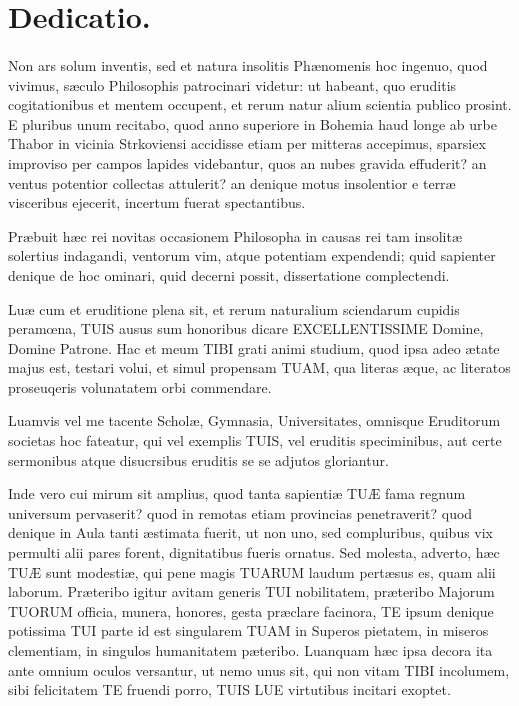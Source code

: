 \documentclass[a4paper, 11pt, oneside, polutonikogreek, latin]{article}
\begin{document}
\section[Dedicatio.]{\bfseries{Dedicatio.}}
\paragraph{}
Non ars solum inventis, sed et natura insolitis Phænomenis hoc ingenuo, quod vivimus, sæculo Philosophis patrocinari videtur: ut habeant, quo eruditis cogitationibus et mentem occupent, et rerum natur alium scientia publico prosint. E pluribus unum recitabo, quod anno superiore in Bohemia haud longe ab urbe Thabor in vicinia Strkoviensi accidisse etiam per mitteras accepimus, sparsiex improviso per campos lapides videbantur, quos an nubes gravida effuderit? an ventus potentior collectas attulerit? an denique motus insolentior e terræ visceribus ejecerit, incertum fuerat spectantibus.

Præbuit hæc rei novitas occasionem Philosopha in causas rei tam insolitæ solertius indagandi, ventorum vim, atque potentiam expendendi; quid sapienter denique de hoc ominari, quid decerni possit, dissertatione complectendi.

Luæ cum et eruditione plena sit, et rerum naturalium sciendarum cupidis peramœna, TUIS ausus sum honoribus dicare EXCELLENTISSIME Domine, Domine Patrone. Hac et meum TIBI grati animi studium, quod ipsa adeo ætate majus est, testari volui, et simul propensam TUAM, qua literas æque, ac literatos proseuqeris volunatatem orbi commendare.

Luamvis vel me tacente Scholæ, Gymnasia, Universitates, omnisque Eruditorum societas hoc fateatur, qui vel exemplis TUIS, vel eruditis speciminibus, aut certe sermonibus atque disucrsibus eruditis se se adjutos gloriantur.

Inde vero cui mirum sit amplius, quod tanta sapientiæ TUÆ fama regnum universum pervaserit? quod in remotas etiam provincias penetraverit? quod denique in Aula tanti æstimata fuerit, ut non uno, sed compluribus, quibus vix permulti alii pares forent, dignitatibus fueris ornatus. Sed molesta, adverto, hæc TUÆ sunt modestiæ, qui pene magis TUARUM laudum pertæsus es, quam alii laborum. Præteribo igitur avitam generis TUI nobilitatem, præteribo Majorum TUORUM officia, munera, honores, gesta præclare facinora, TE ipsum denique potissima TUI parte id est singularem TUAM in Superos pietatem, in miseros clementiam, in singulos humanitatem pæteribo. Luanquam hæc ipsa decora ita ante omnium oculos versantur, ut nemo unus sit, qui non vitam TIBI incolumem, sibi felicitatem TE fruendi porro, TUIS LUE virtutibus incitari exoptet.
\end{document}
